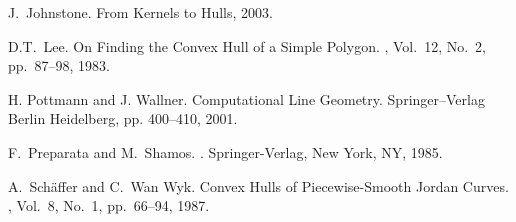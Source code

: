 \documentclass[doublespacing]{elsart}
\begin{document}
\begin{thebibliography}{}
J.~Johnstone.
From Kernels to Hulls, 2003.

D.T.~Lee.
\newblock On Finding the Convex Hull of a Simple Polygon.
,
Vol.~12, No.~2, pp.~87--98, 1983.

H. Pottmann and J. Wallner.
\newblock Computational Line Geometry.
\newblock Springer--Verlag Berlin Heidelberg, pp. 400--410, 2001.

F.~Preparata and M.~Shamos.
.
\newblock Springer-Verlag, New York, NY, 1985.

A.~Sch\"affer and C.~Wan Wyk.
\newblock Convex Hulls of Piecewise-Smooth Jordan Curves.
, Vol.~8, No.~1, pp.~66--94, 1987.

\end{thebibliography}

\end{document}
